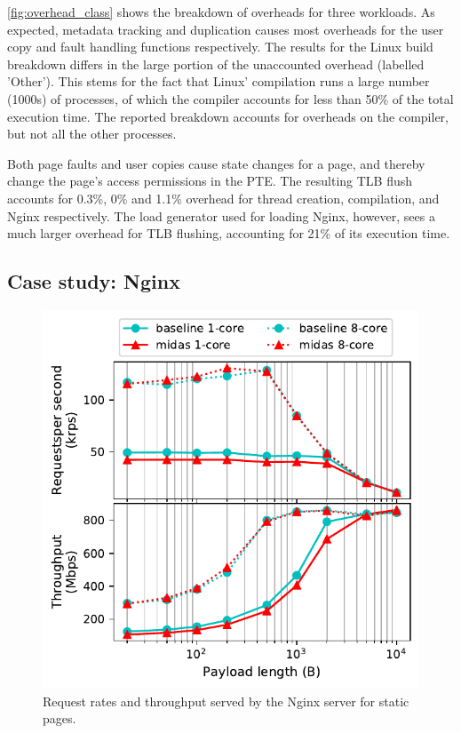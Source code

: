 \documentclass[letterpaper,twocolumn,10pt]{article}
\begin{document}
\autoref{fig:overhead_class} shows the breakdown of overheads for three 
workloads. 
As expected, metadata tracking and duplication causes most overheads
for the user copy and fault handling functions respectively.
The results for the Linux build breakdown differs in the large portion of 
the unaccounted overhead (labelled 'Other').
This stems for the fact that Linux' compilation runs a large number (1000s)
of processes, of which the compiler accounts for less than 50\% of the 
total execution time.
The reported breakdown accounts for overheads on the compiler, but not 
all the other processes.

Both page faults and user copies cause state changes for a page, and thereby
change the page's access permissions in the PTE.
The resulting TLB flush accounts for 0.3\%, 0\% and 1.1\% overhead for
thread creation, compilation, and Nginx respectively.
The load generator  used for loading Nginx, however, sees
a much larger overhead for TLB flushing, accounting for
21\% of its execution time.

\subsection{Case study: Nginx}

\begin{figure}
  \centering
  \includegraphics[width=\linewidth]{img/nginx_performance.pdf}
  \caption{Request rates and throughput served by the Nginx server for 
          static pages.}
  \label{fig:nginx_perf}
\end{figure}
\end{document}
